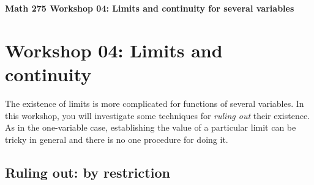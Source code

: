 \documentclass[12pt]{exam}
\begin{document}
\noindent
\textbf{{\large Math 275 \hfill Workshop 04: Limits and continuity for several variables}}

\noindent
{}

\noindent
{}

\noindent

\newtheorem{fact}{Fact}

\section{Workshop 04: Limits and continuity}

The existence of limits is more complicated for functions of several
variables. In this workshop, you will investigate some techniques for
\emph{ruling out} their existence. As in the one-variable case,
establishing the value of a particular limit can be tricky in general
and there is no one procedure for doing it.

\subsection{Ruling out: by restriction}
\end{document}
